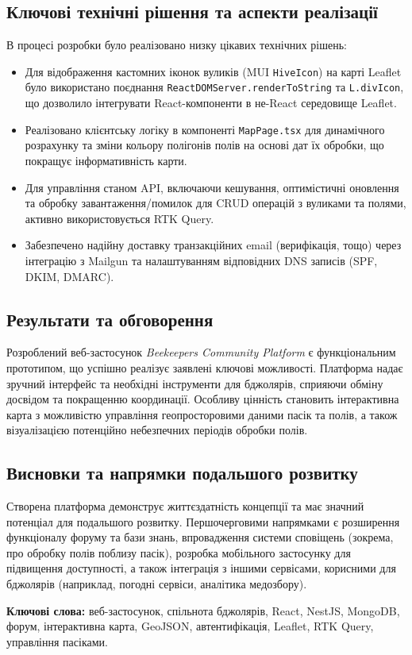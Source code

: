 \subsection*{Ключові технічні рішення та аспекти реалізації}
В процесі розробки було реалізовано низку цікавих технічних рішень:
\begin{itemize}
    \item Для відображення кастомних іконок вуликів (MUI \texttt{HiveIcon}) на карті Leaflet було використано поєднання \texttt{ReactDOMServer.renderToString} та \texttt{L.divIcon}, що дозволило інтегрувати React-компоненти в не-React середовище Leaflet.
    \item Реалізовано клієнтську логіку в компоненті \texttt{MapPage.tsx} для динамічного розрахунку та зміни кольору полігонів полів на основі дат їх обробки, що покращує інформативність карти.
    \item Для управління станом API, включаючи кешування, оптимістичні оновлення та обробку завантаження/помилок для CRUD операцій з вуликами та полями, активно використовується RTK Query.
    \item Забезпечено надійну доставку транзакційних email (верифікація, тощо) через інтеграцію з Mailgun та налаштуванням відповідних DNS записів (SPF, DKIM, DMARC).
\end{itemize}

\subsection*{Результати та обговорення}
Розроблений веб-застосунок \textit{Beekeepers Community Platform} є функціональним прототипом, що успішно реалізує заявлені ключові можливості. Платформа надає зручний інтерфейс та необхідні інструменти для бджолярів, сприяючи обміну досвідом та покращенню координації. Особливу цінність становить інтерактивна карта з можливістю управління геопросторовими даними пасік та полів, а також візуалізацією потенційно небезпечних періодів обробки полів.

\subsection*{Висновки та напрямки подальшого розвитку}
Створена платформа демонструє життєздатність концепції та має значний потенціал для подальшого розвитку. Першочерговими напрямками є розширення функціоналу форуму та бази знань, впровадження системи сповіщень (зокрема, про обробку полів поблизу пасік), розробка мобільного застосунку для підвищення доступності, а також інтеграція з іншими сервісами, корисними для бджолярів (наприклад, погодні сервіси, аналітика медозбору).

\textbf{Ключові слова:} веб-застосунок, спільнота бджолярів, React, NestJS, MongoDB, форум, інтерактивна карта, GeoJSON, автентифікація, Leaflet, RTK Query, управління пасіками.

\newpage 